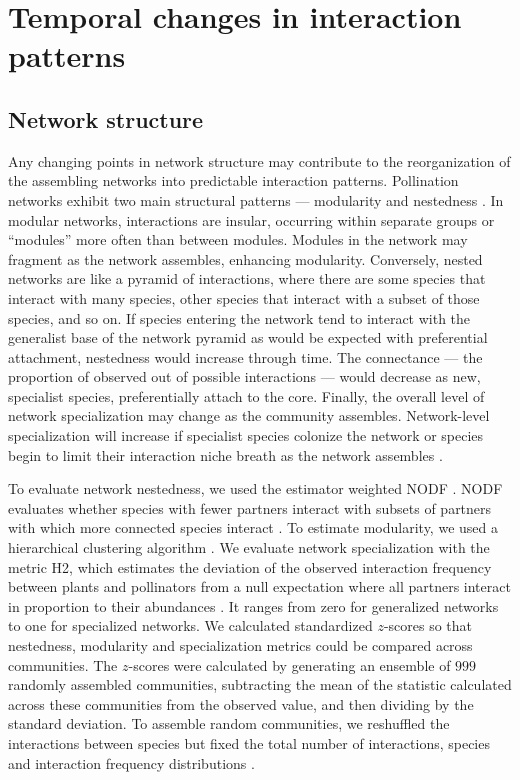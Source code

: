 \documentclass[12pt]{article}
\begin{document}
\section*{Temporal changes in interaction patterns}

\subsection*{Network structure}
Any changing points in network structure may contribute to the
reorganization of the assembling networks into predictable interaction
patterns. Pollination networks exhibit two main structural patterns
--- modularity \citep[e.g.,][]{Olesen2007} and nestedness
\citep[e.g.,][]{Bascompte2006, Bascompte2003}. In modular networks,
interactions are insular, occurring within separate groups or
``modules'' more often than between modules. Modules in the network
may fragment as the network assembles, enhancing
modularity. Conversely, nested networks are like a pyramid of
interactions, where there are some species that interact with many
species, other species that interact with a subset of those species,
and so on. If species entering the network tend to interact with the
generalist base of the network pyramid as would be expected with
preferential attachment, nestedness would increase through time. The
connectance --- the proportion of observed out of possible
interactions --- would decrease as new, specialist species,
preferentially attach to the core. Finally, the overall level of
network specialization may change as the community
assembles. Network-level specialization will increase if specialist
species colonize the network or species begin to limit their
interaction niche breath as the network assembles
\citep{bluthgen-2006-9}.

To evaluate network nestedness, we used the estimator weighted NODF
\citep{almeida-neto-2008-1227}. NODF evaluates whether species with
fewer partners interact with subsets of partners with which more
connected species interact \citep{almeida-neto-2008-1227}. To estimate
modularity, we used a hierarchical clustering algorithm
\citep{Newman2004, csardi-2006}. We evaluate network specialization with
the metric H2, which estimates the deviation of the observed
interaction frequency between plants and pollinators from a null
expectation where all partners interact in proportion to their
abundances \citep{bluthgen-2006-9}. It ranges from zero for
generalized networks to one for specialized networks.  We calculated
standardized $z$-scores so that nestedness, modularity and
specialization metrics could be compared across communities. The
$z$-scores were calculated by generating an ensemble of $999$ randomly
assembled communities, subtracting the mean of the statistic
calculated across these communities from the observed value, and then
dividing by the standard deviation. To assemble random communities, we
reshuffled the interactions between species but fixed the total number
of interactions, species and interaction frequency distributions
\citep{Galeano2009}.
\end{document}
